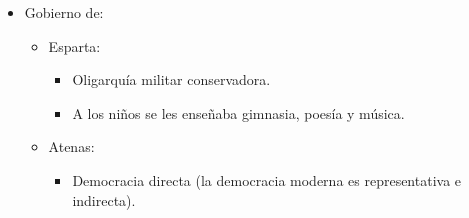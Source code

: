 \begin{itemize}
\item Gobierno de:
\begin{itemize}
	\item Esparta:
		\begin{itemize}
			\item Oligarquía militar conservadora.
			\item A los niños se les enseñaba gimnasia, poesía y música.
		\end{itemize}
	\item Atenas:
		\begin{itemize}
			\item Democracia directa (la democracia moderna es representativa e indirecta).
		\end{itemize}
\end{itemize}

\end{itemize}